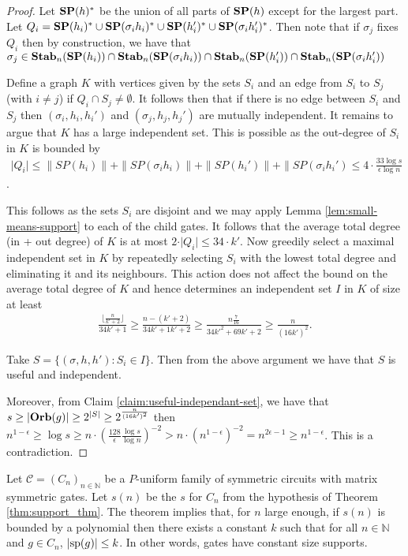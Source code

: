 \documentclass[../paper.tex]{subfiles}
\begin{document}
\begin{proof}
  Let $\text{\textbf{SP}} (h)^*$ be the union of all parts of $\text{\textbf{SP}}(h)$ except for the largest
  part. Let $Q_i = \text{\textbf{SP}}(h_i)^* \cup \text{\textbf{SP}}(\sigma_i h_i)^* \cup \text{\textbf{SP}} (h_i')^* \cup
  \text{\textbf{SP}} (\sigma_i h_i')^*$. Then note that if $\sigma_j$ fixes $Q_i$ then by
  construction, we have that $\sigma_j \in \text{\textbf{Stab}}_n(\text{\textbf{SP}}(h_i)) \cap
  \text{\textbf{Stab}}_n(\text{\textbf{SP}}(\sigma_i h_i)) \cap \text{\textbf{Stab}}_n(\text{\textbf{SP}}(h_i')) \cap \text{\textbf{Stab}}_n(\text{\textbf{SP}}(\sigma_i
  h_i'))$

  Define a graph $K$ with vertices given by the sets $S_i$ and an edge from
  $S_i$ to $S_j$ (with $i \neq j$) if $Q_i \cap S_j \neq \emptyset$. It follows
  then that if there is no edge between $S_i$ and $S_j$ then $(\sigma_i, h_i,
  h_i')$ and $(\sigma_j, h_j, h_j')$ are mutually independent. It remains to
  argue that $K$ has a large independent set. This is possible as the out-degree
  of $S_i$ in $K$ is bounded by
  \begin{align*}
    \vert Q_i \vert \leq \|SP(h_i) \| + \|SP(\sigma_i h_i) \| + \|SP(h_i') \| + \|SP(\sigma_i h_i') \leq 4 \cdot \frac{33\log s}{\epsilon \log n}
  \end{align*}. 

  This follows as the sets $S_i$ are disjoint and we may apply Lemma
  \ref{lem:small-means-support} to each of the child gates. It follows that the
  average total degree (in + out degree) of $K$ is at most $2 \cdot \vert Q_i
  \vert \leq 34 \cdot k'$. Now greedily select a maximal independent set in $K$
  by repeatedly selecting $S_i$ with the lowest total degree and eliminating it
  and its neighbours. This action does not affect the bound on the average total
  degree of $K$ and hence determines an independent set $I$ in $K$ of size at
  least
  \begin{align*}
    \frac{\lfloor \frac{n}{k' + 2} \rfloor}{34k' + 1} \geq \frac{n - (k'+2)}{34k'+1k'+2} \geq \frac{n\frac{7}{16}}{34k'^2 + 69k' +2} \geq \frac{n}{(16k')^2}.
  \end{align*}

  Take $S = \{(\sigma, h, h') : S_i \in I \}$. Then from the above argument we
  have that $S$ is useful and independent.
  
  Moreover, from Claim \ref{claim:useful-independant-set}, we have that $s \geq
  \vert \text{\textbf{Orb}}(g) \vert \geq 2^{\vert S \vert} \geq 2^{\frac{n}{(16k')^2}}$ then
  $n^{1-\epsilon} \geq \log s \geq n \cdot (\frac{128}{\epsilon}\frac{\log
    s}{\log n})^{-2} > n \cdot (n^{1-\epsilon})^{-2} = n^{2\epsilon -1} \geq
  n^{1-\epsilon}$. This is a contradiction.
\end{proof}

Let $\mathcal{C} = (C_n)_{n \in \mathbb{N}}$ be a $P$-uniform family of
symmetric circuits with matrix symmetric gates. Let $s(n)$ be the $s$ for $C_n$
from the hypothesis of Theorem \ref{thm:support_thm}. The theorem implies that,
for $n$ large enough, if $s(n)$ is bounded by a polynomial then there exists a
constant $k$ such that for all $n \in \mathbb{N}$ and $g \in C_n$, $\vert
\text{sp}(g) \vert \leq k$. In other words, gates have constant size supports.
\end{document}
